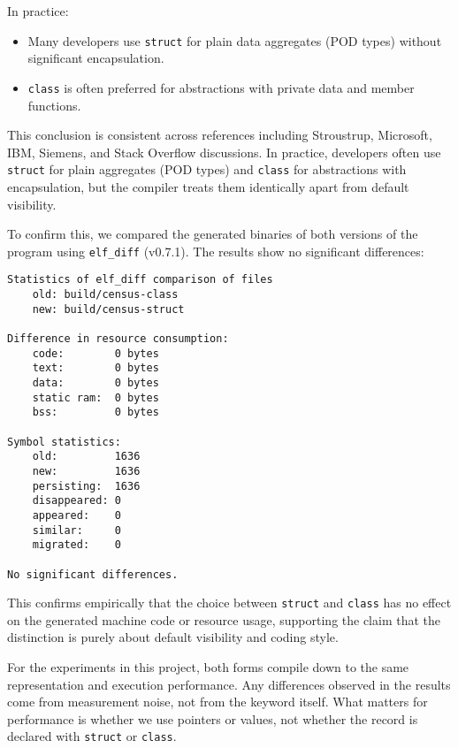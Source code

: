 \documentclass[11pt,letterpaper,oneside]{article}
\begin{document}
In practice:
\begin{itemize}
    \item Many developers use \texttt{struct} for plain data aggregates (POD
    types) without significant encapsulation.
    \item \texttt{class} is often preferred for abstractions with private data
    and member functions.
\end{itemize}

This conclusion is consistent across references including Stroustrup, Microsoft,
IBM, Siemens, and Stack Overflow discussions. In practice, developers often use
\texttt{struct} for plain aggregates (POD types) and \texttt{class} for
abstractions with encapsulation, but the compiler treats them identically apart
from default visibility.

To confirm this, we compared the generated binaries of both versions of the
program using \texttt{elf\_diff} (v0.7.1). The results show no significant
differences:

\begin{lstlisting}[caption={\texttt{elf\_diff} comparison of binaries built with \texttt{class} vs. \texttt{struct}}]
Statistics of elf_diff comparison of files
    old: build/census-class
    new: build/census-struct

Difference in resource consumption:
    code:        0 bytes
    text:        0 bytes
    data:        0 bytes
    static ram:  0 bytes
    bss:         0 bytes

Symbol statistics:
    old:         1636
    new:         1636
    persisting:  1636
    disappeared: 0
    appeared:    0
    similar:     0
    migrated:    0

No significant differences.
\end{lstlisting}

This confirms empirically that the choice between \texttt{struct} and
\texttt{class} has no effect on the generated machine code or resource usage,
supporting the claim that the distinction is purely about default visibility and
coding style.

For the experiments in this project, both forms compile down to the same
representation and execution performance. Any differences observed in the
results come from measurement noise, not from the keyword itself. What matters
for performance is whether we use pointers or values, not whether the record is
declared with \texttt{struct} or \texttt{class}.


\nocite{*}
\printbibliography
\end{document}
